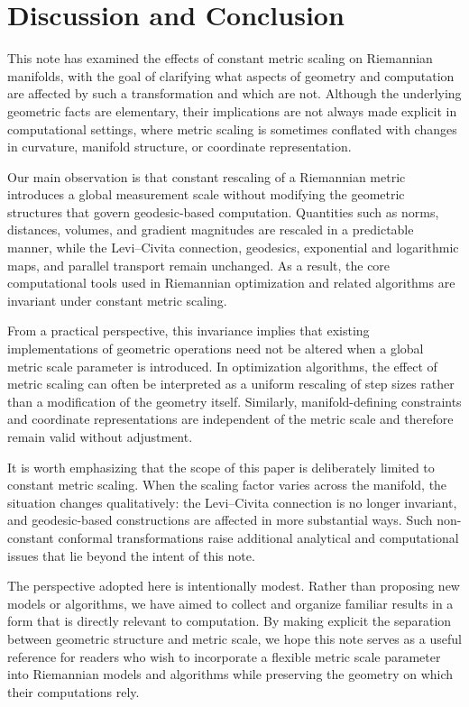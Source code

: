 \documentclass[11pt]{article}
\begin{document}
\section{Discussion and Conclusion}

This note has examined the effects of constant metric scaling on Riemannian
manifolds, with the goal of clarifying what aspects of geometry and computation
are affected by such a transformation and which are not. Although the underlying
geometric facts are elementary, their implications are not always made explicit
in computational settings, where metric scaling is sometimes conflated with
changes in curvature, manifold structure, or coordinate representation.

Our main observation is that constant rescaling of a Riemannian metric introduces
a global measurement scale without modifying the geometric structures that govern
geodesic-based computation. Quantities such as norms, distances, volumes, and
gradient magnitudes are rescaled in a predictable manner, while the Levi--Civita
connection, geodesics, exponential and logarithmic maps, and parallel transport
remain unchanged. As a result, the core computational tools used in Riemannian
optimization and related algorithms are invariant under constant metric scaling.

From a practical perspective, this invariance implies that existing
implementations of geometric operations need not be altered when a global metric
scale parameter is introduced. In optimization algorithms, the effect of metric
scaling can often be interpreted as a uniform rescaling of step sizes rather than
a modification of the geometry itself. Similarly, manifold-defining constraints
and coordinate representations are independent of the metric scale and therefore
remain valid without adjustment.

It is worth emphasizing that the scope of this paper is deliberately limited to
constant metric scaling. When the scaling factor varies across the manifold, the
situation changes qualitatively: the Levi--Civita connection is no longer
invariant, and geodesic-based constructions are affected in more substantial
ways. Such non-constant conformal transformations raise additional analytical and
computational issues that lie beyond the intent of this note.

The perspective adopted here is intentionally modest. Rather than proposing new
models or algorithms, we have aimed to collect and organize familiar results in a
form that is directly relevant to computation. By making explicit the separation
between geometric structure and metric scale, we hope this note serves as a
useful reference for readers who wish to incorporate a flexible metric scale
parameter into Riemannian models and algorithms while preserving the geometry on
which their computations rely.





\end{document}

